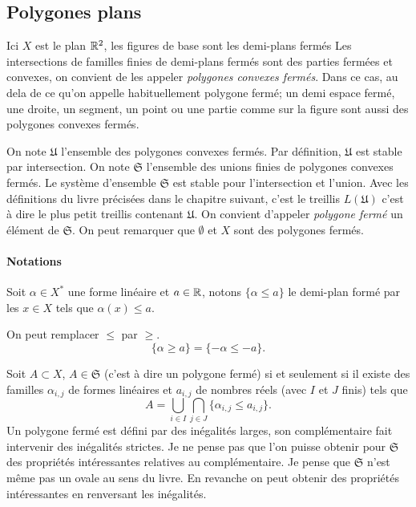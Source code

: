 \subsection{Polygones plans}\label{ExplePolyg}
Ici $X$ est le plan $\mathbb{R}^2$, les figures de base sont les demi-plans fermés Les intersections de familles finies de demi-plans fermés sont des parties fermées et convexes, on convient de les appeler \emph{polygones convexes fermés}. Dans ce cas, au dela de ce qu'on appelle habituellement polygone fermé; un demi espace fermé, une droite, un segment, un point ou une partie comme sur la figure sont aussi des polygones convexes fermés.

On  note $\mathfrak U$ l'ensemble des polygones convexes fermés. Par définition, $\mathfrak{U}$ est stable par intersection. On note $\mathfrak{S}$ l'ensemble des unions finies de polygones convexes fermés. Le système d'ensemble $\mathfrak{S}$ est stable pour l'intersection et l'union. Avec les définitions du livre précisées dans le chapitre suivant, c'est le treillis $L(\mathfrak U)$ c'est à dire le plus petit treillis contenant $\mathfrak{U}$.\newline
On convient d'appeler \emph{polygone fermé} un élément de $\mathfrak{S}$. On peut remarquer que $\emptyset$ et $X$ sont des polygones fermés.

\paragraph{Notations}
\label{sec:notpolygones}
Soit $\alpha \in X^*$ une forme linéaire et $a\in \mathbb{R}$, notons $\{ \alpha \leq a\}$ le demi-plan formé par les $x \in X$ tels que $\alpha(x) \leq a$.


\begin{rem} On peut remplacer $\leq$ par $\geq$.
 \begin{displaymath}
   \{ \alpha \geq a \} = \{ -\alpha \leq -a \}.
 \end{displaymath}
\end{rem}

Soit $A\subset X$, $A \in \mathfrak{S}$ (c'est à dire un polygone fermé) si et seulement si il existe des familles $\alpha_{i,j}$ de formes linéaires et $a_{i,j}$ de nombres réels (avec $I$ et $J$ finis) tels que
\begin{displaymath}
 A = \bigcup_{i \in I} \bigcap_{j \in J}\{ \alpha_{i,j} \leq a_{i,j}\}.
\end{displaymath}
Un polygone fermé est défini par des inégalités larges, son complémentaire fait intervenir des inégalités strictes. Je ne pense pas que l'on puisse obtenir pour $\mathfrak{S}$ des propriétés intéressantes relatives au complémentaire. Je pense que $\mathfrak{S}$ n'est même pas un ovale au sens du livre.\newline
En revanche on peut obtenir des propriétés intéressantes en renversant les inégalités.


